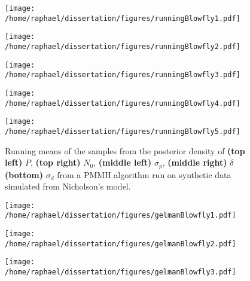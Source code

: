 \documentclass[12pt]{article}
\begin{document}
\begin{appendices}
	\begin{figure}[htb]
		\centering
		\begin{minipage}{0.49\textwidth}
			\centering
			\texttt{[image: /home/raphael/dissertation/figures/runningBlowfly1.pdf]}
		\end{minipage}
		\begin{minipage}{0.49\textwidth}
			\centering
			\texttt{[image: /home/raphael/dissertation/figures/runningBlowfly2.pdf]}
		\end{minipage}
		\begin{minipage}{0.49\textwidth}
			\centering
			\texttt{[image: /home/raphael/dissertation/figures/runningBlowfly3.pdf]}
		\end{minipage}
		\begin{minipage}{0.49\textwidth}
			\centering
			\texttt{[image: /home/raphael/dissertation/figures/runningBlowfly4.pdf]}
		\end{minipage}
		\begin{minipage}{0.49\textwidth}
			\centering
			\texttt{[image: /home/raphael/dissertation/figures/runningBlowfly5.pdf]}
		\end{minipage}
		\caption[Running means of the samples from a PMMH algorithm run on synthetic data, Nicholson's model]{Running means of the samples from the posterior density of \textbf{(top left)} $P$, \textbf{(top right)} $N_0$,  \textbf{(middle left)} $\sigma_p$,  \textbf{(middle right)} $\delta$ \textbf{(bottom)} $\sigma_d$ from a PMMH algorithm run on synthetic data simulated from Nicholson's model.}
		\label{fig:rmBlowfly}
	\end{figure}
	\begin{figure}[htb]
		\centering
		\begin{minipage}{0.49\textwidth}
			\centering
			\texttt{[image: /home/raphael/dissertation/figures/gelmanBlowfly1.pdf]}
		\end{minipage}
		\begin{minipage}{0.49\textwidth}
			\centering
			\texttt{[image: /home/raphael/dissertation/figures/gelmanBlowfly2.pdf]}
		\end{minipage}
		\begin{minipage}{0.49\textwidth}
			\centering
			\texttt{[image: /home/raphael/dissertation/figures/gelmanBlowfly3.pdf]}
		\end{minipage}
		\begin{minipage}{0.49\textwidth}

\end{minipage}
\end{figure}
\end{appendices}
\end{document}
